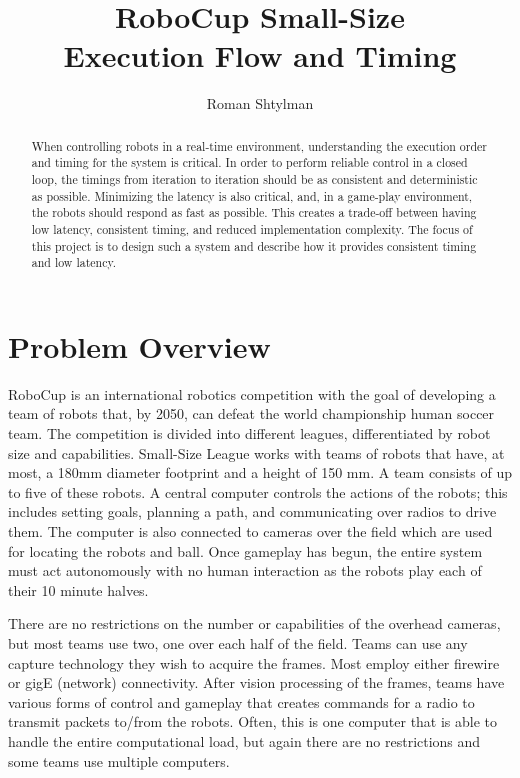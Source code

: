 \documentclass[letterpaper]{llncs}
\title{RoboCup Small-Size\\Execution Flow and Timing}
\author{Roman Shtylman\\\email{shtylman@gmail.com}}
\institute{Georgia Institute of Technology}
\begin{document}
\maketitle

\begin{abstract}
When controlling robots in a real-time environment, understanding the execution order and timing for the system is critical. In order to perform reliable control in a closed loop, the timings from iteration to iteration should be as consistent and deterministic as possible. Minimizing the latency is also critical, and, in a game-play environment, the robots should respond as fast as possible. This creates a trade-off between having low latency, consistent timing, and reduced implementation complexity. The focus of this project is to design such a system and describe how it provides consistent timing and low latency.
\end{abstract}

\section{Problem Overview}
RoboCup is an international robotics competition with the goal of developing a team of robots that, by 2050, can defeat the world championship human soccer team. The competition is divided into different leagues, differentiated by robot size and capabilities. Small-Size League works with teams of robots that have, at most, a 180mm diameter footprint and a height of 150 mm. A team consists of up to five of these robots. A central computer controls the actions of the robots; this includes setting goals, planning a path, and communicating over radios to drive them. The computer is also connected to cameras over the field which are used for locating the robots and ball. Once gameplay has begun, the entire system must act autonomously with no human interaction as the robots play each of their 10 minute halves.

There are no restrictions on the number or capabilities of the overhead cameras, but most teams use two, one over each half of the field. Teams can use any capture technology they wish to acquire the frames. Most employ either firewire or gigE (network) connectivity. After vision processing of the frames, teams have various forms of control and gameplay that creates commands for a radio to transmit packets to/from the robots. Often, this is one computer that is able to handle the entire computational load, but again there are no restrictions and some teams use multiple computers.
\end{document}
